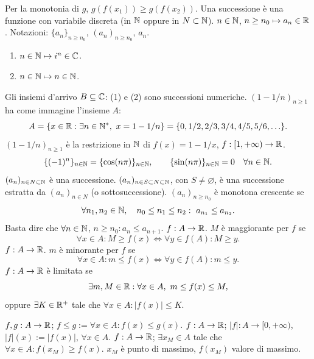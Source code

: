 Per la monotonia di $g$, $g(f(x_1))\ge g(f(x_2))$.
Una successione è una funzione con variabile discreta (in $\mathbb N$ oppure in $N\subset\mathbb N$).
$n\in\mathbb N$, $n\ge n_0\mapsto a_n\in\mathbb R$.
Notazioni: $\{a_n\}_{n\ge n_0}$, $(a_n)_{n\ge n_0}$, $a_n$.
\begin{enumerate}\item $n\in\mathbb N\mapsto i^n\in\mathbb C$.
\item $n\in\mathbb N\mapsto n\in\mathbb N$.
\end{enumerate}
Gli insiemi d'arrivo $B\subseteq\mathbb C$: (1) e (2) sono successioni numeriche.
$(1-1/n)_{n\ge1}$ ha come immagine l'insieme $A$:
\[A=\{x\in\R:\exists n\in\N^*,\ x=1-1/n\}=\{0,1/2,2/3,3/4,4/5,5/6,\ldots\}.\]
$(1-1/n)_{n\ge1}$ è la restrizione in $\mathbb N$ di $f(x)=1-1/x$, $f:[1,+\infty)\to\mathbb R$.
\[\{(-1)^n\}_{n\in\mathbb N}=\{\cos(n\pi)\}_{n\in\mathbb N},\qquad\{\sin(n\pi)\}_{n\in\mathbb N}=0\quad\forall n\in\mathbb N.\]
$(a_n)_{n\in N\subset\mathbb N}$ è una successione.
$(a_n)_{n\in S\subset N\subset\mathbb N}$, con $S\ne\varnothing$, è una successione estratta da $(a_n)_{n\in N}$ (o sottosuccessione).
$(a_n)_{n\ge n_0}$ è monotona crescente se
\[\forall n_1,n_2\in\mathbb N,\quad n_0\le n_1\le n_2:\ a_{n_1}\le a_{n_2}.\]
Basta dire che $\forall n\in\mathbb N$, $n\ge n_0:a_n\le a_{n+1}$.
$f:A\to\mathbb R$. $M$ è maggiorante per $f$ se
\[\forall x\in A:M\ge f(x)\iff\forall y\in f(A):M\ge y.\]
$f:A\to\mathbb R$. $m$ è minorante per $f$ se
\[\forall x\in A:m\le f(x)\iff\forall y\in f(A):m\le y.\]
$f:A\to\mathbb R$ è limitata se
\[\exists m,M\in\mathbb R:\forall x\in A,\ m\le f(x)\le M,\]
oppure $\exists K\in\mathbb R^+$ tale che $\forall x\in A:|f(x)|\le K$.
\begin{center}\end{center}
$f,g:A\to\mathbb R$; $f\le g:=\forall x\in A:f(x)\le g(x)$.
$f:A\to\mathbb R$; $|f|:A\to[0,+\infty)$, $|f|(x):=|f(x)|$, $\forall x\in A$.
$f:A\to\mathbb R$; $\exists x_M\in A$ tale che $\forall x\in A:f(x_M)\ge f(x)$.
$x_M$ è punto di massimo, $f(x_M)$ valore di massimo.
